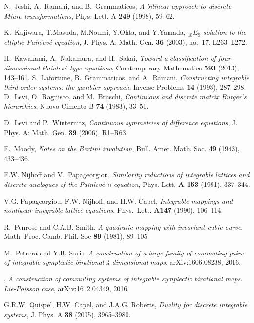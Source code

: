 \documentclass[reqno]{amsart}
\numberwithin{equation}{section}
\numberwithin{figure}{section}
\begin{document}
\begin{thebibliography}{10}
N.~Joshi, A.~Ramani, and B.~Grammaticos, \emph{A bilinear approach to discrete
  {M}iura transformations}, Phys. Lett. A \textbf{249} (1998), 59--62.

K.~Kajiwara, T.Masuda, M.Noumi, Y.Ohta, and Y.Yamada, \emph{$_{10}{E_9}$
  solution to the elliptic {P}ainlev{\'e} equation}, J. Phys. A: Math. Gen.
  \textbf{36} (2003), no.~17, L263--L272.

H.~Kawakami, A.~Nakamura, and H.~Sakai, \emph{Toward a classification of
  four-dimensional {P}ainlev{\'e}-type equations}, Comtemporary {M}athematics
  \textbf{593} (2013), 143--161.
{  
S.~Lafortune, B.~Grammaticos, and A.~Ramani, \emph{Constructing integrable
  third order systems: the gambier approach}, Inverse Problems \textbf{14}
  (1998), 287--298.
}
D.~Levi, O.~Ragnisco, and M.~Bruschi, \emph{Continuous and discrete matrix
  {B}urger's hierarchies}, Nuovo Cimento B \textbf{74} (1983), 33--51.

D.~Levi and P.~Winternitz, \emph{Continuous symmetries of difference
  equations}, J. Phys. A: Math. Gen. \textbf{39} (2006), R1--R63.

E.~Moody, \emph{Notes on the {B}ertini involution}, Bull. Amer. Math. Soc.
  \textbf{49} (1943), 433--436.

F.W. Nijhoff and V.~Papageorgiou, \emph{Similarity reductions of integrable
  lattices and discrete analogues of the {P}ainlev\'e ii equation}, Phys. Lett.
  \textbf{A 153} (1991), 337--344.

V.G. Papageorgiou, F.W. Nijhoff, and H.W. Capel, \emph{Integrable mappings and
  nonlinear integrable lattice equations}, Phys.\ Lett. \textbf{A147} (1990),
  106--114.

R.~Penrose and C.A.B. Smith, \emph{A quadratic mapping with invariant cubic
  curve}, Math. Proc. Camb. Phil. Soc \textbf{89} (1981), 89--105.

M.~Petrera and Y.B. Suris, \emph{A construction of a large family of commuting
  pairs of integrable symplectic birational 4-dimensional maps},
  arXiv:1606.08238, 2016.

\bysame, \emph{A construction of commuting systems of integrable symplectic
  birational maps. {L}ie-{P}oisson case}, arXiv:1612.04349, 2016.

G.R.W. Quispel, H.W. Capel, and J.A.G. Roberts, \emph{Duality for discrete
  integrable systems}, J. Phys. A \textbf{38} (2005), 3965--3980.


\end{thebibliography}
\end{document}
